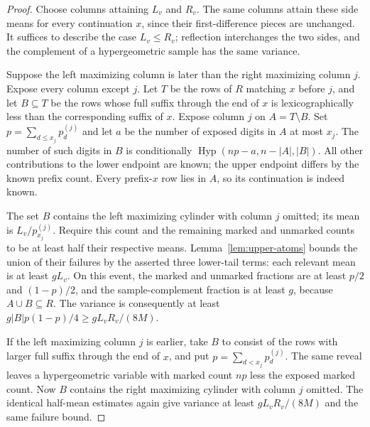 \begin{proof}
Choose columns attaining $L_v$ and $R_v$. The same columns attain
these side means for every continuation $x$, since their
first-difference pieces are unchanged. It suffices to describe the
case $L_v\le R_v$; reflection interchanges the two sides, and the
complement of a hypergeometric sample has the same variance.

Suppose the left maximizing column is later than the right maximizing
column $j$. Expose every column except $j$. Let $T$ be the rows of
$R$ matching $x$ before $j$, and let $B\subseteq T$ be the rows whose
full suffix through the end of $x$ is lexicographically less than
the corresponding suffix of $x$. Expose column $j$ on
$A=T\setminus B$. Set $p=\sum_{d\le x_j}p_d^{(j)}$ and let $a$
be the number of exposed digits in $A$ at most $x_j$. The number
of such digits in $B$ is conditionally
$\operatorname{Hyp}(np-a,n-|A|,|B|)$. All other contributions to the
lower endpoint are known; the upper endpoint differs by the known
prefix count. Every prefix-$x$ row lies in $A$, so its continuation
is indeed known.

The set $B$ contains the left maximizing cylinder with column $j$
omitted; its mean is $L_v/p_{x_j}^{(j)}$. Require this count and
the remaining marked and unmarked counts to be at least half their
respective means. Lemma~\ref{lem:upper-atoms} bounds the union of
their failures by the asserted three lower-tail terms: each relevant
mean is at least $gL_v$. On this event, the marked and unmarked
fractions are at least $p/2$ and $(1-p)/2$, and the sample-complement
fraction is at least $g$, because $A\cup B\subseteq R$.
The variance is consequently at least
$g|B|p(1-p)/4\ge gL_vR_v/(8M)$.

If the left maximizing column $j$ is earlier, take $B$ to consist of
the rows with larger full suffix through the end of $x$,
and put $p=\sum_{d<x_j}p_d^{(j)}$. The same reveal leaves a
hypergeometric variable with marked count $np$ less the exposed
marked count. Now $B$ contains the right maximizing cylinder with
column $j$ omitted. The identical half-mean estimates again give
variance at least $gL_vR_v/(8M)$ and the same failure bound.


\end{proof}
